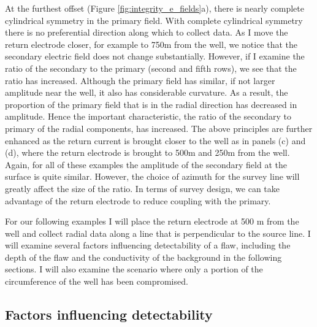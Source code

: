 

At the furthest offset (Figure \ref{fig:integrity_e_fields}a), there is nearly complete cylindrical symmetry in the primary field. With complete cylindrical symmetry there is no preferential direction along which to collect data. As I move the return electrode closer, for example to 750m from the well, we notice that the secondary electric field does not change substantially. However, if I examine the ratio of the secondary to the primary (second and fifth rows), we see that the ratio has increased. Although the primary field has similar, if not larger amplitude near the well, it also has considerable curvature. As a result, the proportion of the primary field that is in the radial direction has decreased in amplitude. Hence the important characteristic, the ratio of the secondary to primary of the radial components, has increased. The above principles are further enhanced as the return current is brought closer to the well as in panels (c) and (d), where the return electrode is brought to 500m and 250m from the well.  Again, for all of these examples the amplitude of the secondary field at the surface is quite similar. However, the choice of azimuth for the survey line will greatly affect the size of the ratio. In terms of survey design, we can take advantage of the return electrode to reduce coupling with the primary.

For our following examples I will place the return electrode at 500 m from the well and collect radial data along a line that is perpendicular to the source line. I will examine several factors influencing detectability of a flaw, including the depth of the flaw and the conductivity of the background in the following sections. I will also examine the scenario where only a portion of the circumference of the well has been compromised.


\subsection{Factors influencing detectability}
